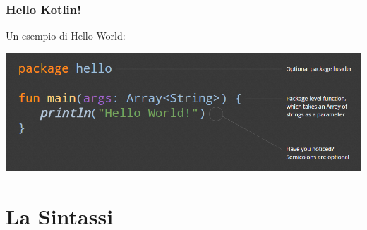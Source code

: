     \begin{frame}
      \frametitle{Hello Kotlin!}
      Un esempio di Hello World:
      \begin{center}
        \includegraphics[scale=0.5]{img/HelloWorld}
      \end{center}
    \end{frame}

    \section{La Sintassi}
